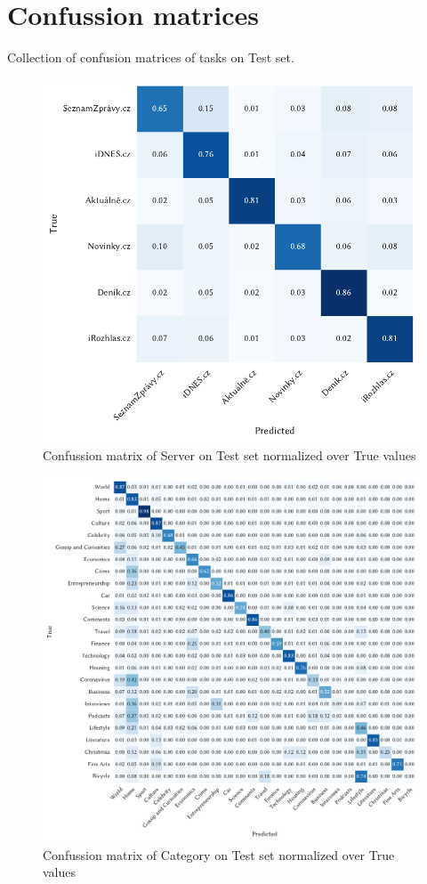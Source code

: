 \chapter{Confussion matrices}
Collection of confusion matrices of tasks on Test set.
\begin{figure}
    \centering
    \includegraphics[width=1.0\textwidth]{img/conf_matrix/server_test_confusion_matrix.pdf}
    \caption{Confussion matrix of Server on Test set normalized over True values}
    \label{fig:server-conf}
\end{figure}
\begin{figure}
    \centering
    \includegraphics[width=1.0\textwidth]{img/conf_matrix/category_test_confusion_matrix.pdf}
    \caption{Confussion matrix of Category on Test set normalized over True values}
    \label{fig:category-conf}
\end{figure}
